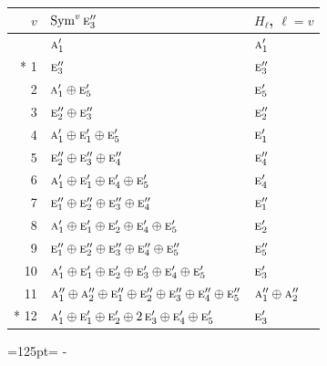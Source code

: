 \documentclass[10pt,a4paper]{article}
\newcommand{\needspace}[1]{\par\penalty-100\begingroup\dimen0=#1\relax\dimen2=\pagegoal
  \advance\dimen2-\pagetotal\ifdim\dimen0>\dimen2\relax\ifdim\dimen2>0pt\vfil\break\fi\fi
  \endgroup}
\numberwithin{equation}{section}
\newcommand{\irr}[1]{\text{\normalfont\scshape #1}}
\begin{document}
{\small\begin{longtable}{@{}rll@{}}\toprule
$v$ & $\operatorname{Sym}^{v}\irr{e}_{3}''$ & $H_\ell$, $\ell = v$\\\midrule\endhead
\bottomrule\endfoot\endlastfoot
0 & $\irr{a}_{1}'$ & $\irr{a}_{1}'$\\*
1 & $\irr{e}_{3}''$ & $\irr{e}_{3}''$\\
2 & $\irr{a}_{1}' \oplus \irr{e}_{5}'$ & $\irr{e}_{5}'$\\
3 & $\irr{e}_{2}'' \oplus \irr{e}_{3}''$ & $\irr{e}_{2}''$\\
4 & $\irr{a}_{1}' \oplus \irr{e}_{1}' \oplus \irr{e}_{5}'$ & $\irr{e}_{1}'$\\
5 & $\irr{e}_{2}'' \oplus \irr{e}_{3}'' \oplus \irr{e}_{4}''$ & $\irr{e}_{4}''$\\
6 & $\irr{a}_{1}' \oplus \irr{e}_{1}' \oplus \irr{e}_{4}' \oplus \irr{e}_{5}'$ & $\irr{e}_{4}'$\\
7 & $\irr{e}_{1}'' \oplus \irr{e}_{2}'' \oplus \irr{e}_{3}'' \oplus \irr{e}_{4}''$ & $\irr{e}_{1}''$\\
8 & $\irr{a}_{1}' \oplus \irr{e}_{1}' \oplus \irr{e}_{2}' \oplus \irr{e}_{4}' \oplus \irr{e}_{5}'$ & $\irr{e}_{2}'$\\
9 & $\irr{e}_{1}'' \oplus \irr{e}_{2}'' \oplus \irr{e}_{3}'' \oplus \irr{e}_{4}'' \oplus \irr{e}_{5}''$ & $\irr{e}_{5}''$\\
10 & $\irr{a}_{1}' \oplus \irr{e}_{1}' \oplus \irr{e}_{2}' \oplus \irr{e}_{3}' \oplus \irr{e}_{4}' \oplus \irr{e}_{5}'$ & $\irr{e}_{3}'$\\
11 & $\irr{a}_{1}'' \oplus \irr{a}_{2}'' \oplus \irr{e}_{1}'' \oplus \irr{e}_{2}'' \oplus \irr{e}_{3}'' \oplus \irr{e}_{4}'' \oplus \irr{e}_{5}''$ & $\irr{a}_{1}'' \oplus \irr{a}_{2}''$\\*
12 & $\irr{a}_{1}' \oplus \irr{e}_{1}' \oplus \irr{e}_{2}' \oplus 2\,\irr{e}_{3}' \oplus \irr{e}_{4}' \oplus \irr{e}_{5}'$ & $\irr{e}_{3}'$\\
\bottomrule\end{longtable}}
\needspace{125pt}
\end{document}

